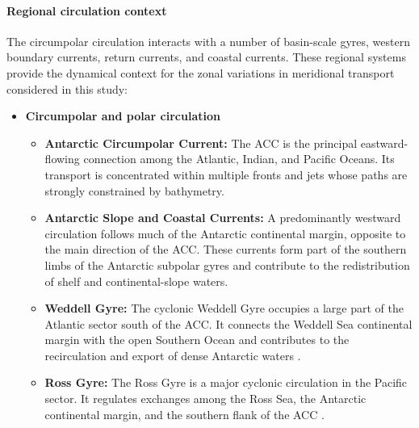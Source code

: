 \documentclass[
  draft
]{agujournal2025}
\begin{document}
    \paragraph{Regional circulation context}

        The circumpolar circulation interacts with a number of basin-scale gyres, western boundary currents, return currents, and coastal currents. These regional systems provide the dynamical context for the zonal variations in meridional transport considered in this study:
        
        \begin{itemize}
        
            \item \textbf{Circumpolar and polar circulation}
            \begin{itemize}
        
                \item \textbf{Antarctic Circumpolar Current:}
                The ACC is the principal eastward-flowing connection among the Atlantic, Indian, and Pacific Oceans. Its transport is concentrated within multiple fronts and jets whose paths are strongly constrained by bathymetry.
        
                \item \textbf{Antarctic Slope and Coastal Currents:}
                A predominantly westward circulation follows much of the Antarctic continental margin, opposite to the main direction of the ACC. These currents form part of the southern limbs of the Antarctic subpolar gyres and contribute to the redistribution of shelf and continental-slope waters.
                
                \item \textbf{Weddell Gyre:}
                The cyclonic Weddell Gyre occupies a large part of the Atlantic sector south of the ACC. It connects the Weddell Sea continental margin with the open Southern Ocean and contributes to the recirculation and export of dense Antarctic waters
                \cite{art:vernet2019}.
        
                \item \textbf{Ross Gyre:}
                The Ross Gyre is a major cyclonic circulation in the Pacific sector. It regulates exchanges among the Ross Sea, the Antarctic continental margin, and the southern flank of the ACC \cite{art:dotto2018}.
        
            \end{itemize}
        

\end{itemize}
\end{document}
